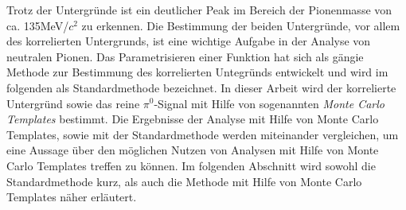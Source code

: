 Trotz der Untergr\"unde ist ein deutlicher Peak im Bereich der Pionenmasse von ca. 135MeV/$c^{2}$ zu erkennen.
Die Bestimmung der beiden Untergr\"unde, vor allem des korrelierten Untergrunds, ist eine wichtige Aufgabe in der Analyse von neutralen Pionen.
Das Parametrisieren einer Funktion hat sich als g\"angie Methode zur Bestimmung des korrelierten Untegr\"unds entwickelt und wird im folgenden als Standardmethode bezeichnet.
In dieser Arbeit wird der korrelierte Untergr\"und sowie das reine $\pi^{0}$-Signal mit Hilfe von sogenannten \textit{Monte Carlo Templates} bestimmt.
Die Ergebnisse der Analyse mit Hilfe von Monte Carlo Templates, sowie mit der Standardmethode werden miteinander vergleichen, um eine Aussage \"uber den m\"oglichen Nutzen von Analysen mit Hilfe von Monte Carlo Templates treffen zu k\"onnen.
Im folgenden Abschnitt wird sowohl die Standardmethode kurz, als auch die Methode mit Hilfe von Monte Carlo Templates n\"aher erl\"autert.
